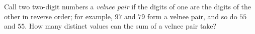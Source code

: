Call two two-digit numbers a \emph{velnee pair} if the digits of one are the digits of the other in reverse order; for example, $97$ and $79$ form a velnee pair, and so do $55$ and $55$. How many distinct values can the sum of a velnee pair take?
